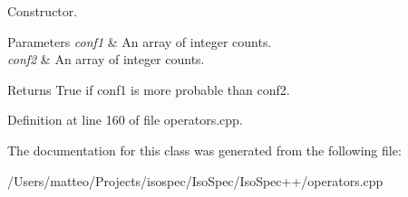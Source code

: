 Constructor. 


\begin{DoxyParams}{Parameters}
{\em conf1} & An array of integer counts. \\
\hline
{\em conf2} & An array of integer counts. \\
\hline
\end{DoxyParams}
\begin{DoxyReturn}{Returns}
True if conf1 is more probable than conf2. 
\end{DoxyReturn}


Definition at line 160 of file operators.\+cpp.



The documentation for this class was generated from the following file\+:\begin{DoxyCompactItemize}
\item 
/\+Users/matteo/\+Projects/isospec/\+Iso\+Spec/\+Iso\+Spec++/operators.\+cpp\end{DoxyCompactItemize}
